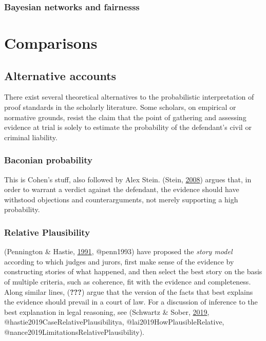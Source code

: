 \documentclass[]{book}
\begin{document}
\section{Bayesian networks and fairnesss}

\part{Comparisons}

\chapter{Alternative accounts}

There exist several theoretical alternatives to the probabilistic interpretation of proof standards in the scholarly literature. Some scholars, on empirical or normative grounds, resist the claim that the point of gathering and assessing evidence at trial is solely to estimate the probability of the defendant's civil or criminal liability.

\section{Baconian probability}

This is Cohen's stuff, also followed by Alex Stein. (Stein, \protect\hyperlink{ref-stein2008}{2008}) argues that, in order to warrant a verdict against the defendant, the evidence should have withstood objections and counterarguments, not merely supporting a high probability.

\section{Relative Plausibility}

(Pennington \& Hastie, \protect\hyperlink{ref-Pennington1991}{1991}, @penn1993) have proposed the \textit{story model} according to which judges and jurors, first make sense of the evidence by constructing stories of what happened, and then select the best story on the basis of multiple criteria, such as coherence, fit with the evidence and completeness.
Along similar lines, ({\textbf{???}}) argue that the version of the facts that best explains the evidence should prevail in a court of law. For a discussion of inference to the best explanation in legal reasoning, see (Schwartz \& Sober, \protect\hyperlink{ref-schwartz2019WhatRelativePlausibility}{2019}, @hastie2019CaseRelativePlausibilitya, @lai2019HowPlausibleRelative, @nance2019LimitationsRelativePlausibility).
\end{document}
